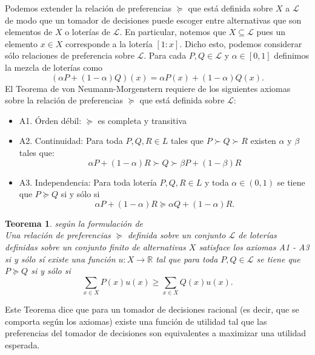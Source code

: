 \documentclass[11pt]{article}
\theoremstyle{plain}
\newtheorem{teo}{Teorema}
\begin{document}
Podemos extender la relación de preferencias $\succeq$ que está definida sobre $X$ a $\mathcal{L}$ de modo que un tomador de decisiones puede escoger entre alternativas que son elementos de $X$ o loterías de $\mathcal{L}$. En particular, notemos que $X \subseteq \mathcal{L}$ pues un elemento $x \in X$ corresponde a la lotería $[1:x]$. Dicho esto, podemos considerar sólo relaciones de preferencia sobre $\mathcal{L}$. Para cada $P, Q \in \mathcal{L}$ y $\alpha \in [0,1]$ definimos la mezcla de loterías como
\[ (\alpha P + (1- \alpha)Q)(x) = \alpha P(x) + (1-\alpha)Q(x). \]
El Teorema de von Neumann-Morgenstern requiere de los siguientes axiomas sobre la relación de preferencias $\succeq$ que está definida sobre $\mathcal{L}$:
\begin{itemize}
\item A1. Órden débil: $\succeq$ es completa y transitiva
\item A2. Continuidad: Para toda $P,Q,R \in L$ tales que $P \succ Q \succ R$ existen $\alpha$ y $\beta$ tales que:
\[  \alpha P + (1-\alpha) R \succ Q \succ \beta P + (1-\beta) R\]
\item A3. Independencia: Para toda lotería $P,Q,R \in L$ y toda $\alpha \in (0,1)$ se tiene que $P \succeq Q$ si y sólo si 
\[\alpha P + (1-\alpha) R \succeq \alpha Q  + (1-\alpha) R.\]
\end{itemize}
\begin{teo}{según la formulación de \cite{jensen1967introduction}}\\
Una relación de preferencias $\succeq$ definida sobre un conjunto $\mathcal{L}$ de loterías definidas sobre un conjunto finito de alternativas $X$ satisface los axiomas A1 - A3 si y sólo sí existe una función $u: X \to \mathbb{R}$ tal que para toda $P,Q \in \mathcal{L}$ se tiene que $P \succeq Q$ si y sólo si 
\[ \sum_{x \in X} P(x) u(x) \geq \sum_{x \in X} Q(x) u(x).  \]
\end{teo}
Este Teorema dice que para un tomador de decisiones racional (es decir, que se comporta según los axiomas) existe una función de utilidad tal que las preferencias del tomador de decisiones son equivalentes a maximizar una utilidad esperada.
\end{document}
